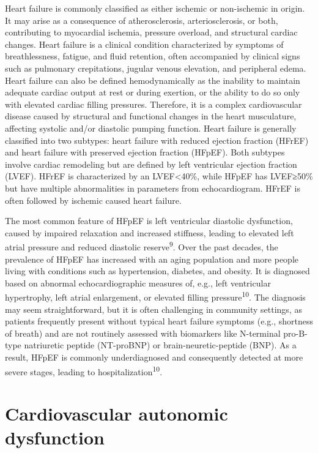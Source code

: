 \documentclass[
  a4paper,
  headsepline=true,
  open=any]{scrbook}
\begin{document}
Heart failure is commonly classified as either ischemic or non-ischemic
in origin. It may arise as a consequence of atherosclerosis,
arteriosclerosis, or both, contributing to myocardial ischemia, pressure
overload, and structural cardiac changes. Heart failure is a clinical
condition characterized by symptoms of breathlessness, fatigue, and
fluid retention, often accompanied by clinical signs such as pulmonary
crepitations, jugular venous elevation, and peripheral edema. Heart
failure can also be defined hemodynamically as the inability to maintain
adequate cardiac output at rest or during exertion, or the ability to do
so only with elevated cardiac filling pressures. Therefore, it is a
complex cardiovascular disease caused by structural and functional
changes in the heart musculature, affecting systolic and/or diastolic
pumping function. Heart failure is generally classified into two
subtypes: heart failure with reduced ejection fraction (HFrEF) and heart
failure with preserved ejection fraction (HFpEF). Both subtypes involve
cardiac remodeling but are defined by left ventricular ejection fraction
(LVEF). HFrEF is characterized by an LVEF\textless40\%, while HFpEF has
LVEF≥50\% but have multiple abnormalities in parameters from
echocardiogram. HFrEF is often followed by ischemic caused heart
failure.

The most common feature of HFpEF is left ventricular diastolic
dysfunction, caused by impaired relaxation and increased stiffness,
leading to elevated left atrial pressure and reduced diastolic
reserve\textsuperscript{9}. Over the past decades, the prevalence of
HFpEF has increased with an aging population and more people living with
conditions such as hypertension, diabetes, and obesity. It is diagnosed
based on abnormal echocardiographic measures of, e.g., left ventricular
hypertrophy, left atrial enlargement, or elevated filling
pressure\textsuperscript{10}. The diagnosis may seem straightforward,
but it is often challenging in community settings, as patients
frequently present without typical heart failure symptoms (e.g.,
shortness of breath) and are not routinely assessed with biomarkers like
N-terminal pro-B-type natriuretic peptide (NT-proBNP) or
brain-neuretic-peptide (BNP). As a result, HFpEF is commonly
underdiagnosed and consequently detected at more severe stages, leading
to hospitalization\textsuperscript{10}.

\hypertarget{cardiovascular-autonomic-dysfunction}{%
\section{Cardiovascular autonomic
dysfunction}\label{cardiovascular-autonomic-dysfunction}}
\end{document}
